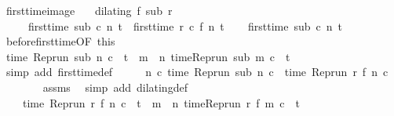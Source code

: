 \begin{isabellebody}
\isamarkupfalse%
\ first{\isacharunderscore}time{\isacharunderscore}image{\isacharcolon}\isanewline
\ \ \ {\isacartoucheopen}dilating\ f\ sub\ r{\isacartoucheclose}\isanewline
\ \ \ \ \ {\isacartoucheopen}first{\isacharunderscore}time\ sub\ c\ n\ t\ {\isacharequal}\ first{\isacharunderscore}time\ r\ c\ {\isacharparenleft}f\ n{\isacharparenright}\ t{\isacartoucheclose}\isanewline
%
\isadelimproof
%
\endisadelimproof
%
\isatagproof
{}\isamarkupfalse%
\isanewline
\ \ \isamarkupfalse%
\ {\isacartoucheopen}first{\isacharunderscore}time\ sub\ c\ n\ t{\isacartoucheclose}\isanewline
\ \ \isamarkupfalse%
\ before{\isacharunderscore}first{\isacharunderscore}time{\isacharbrackleft}OF\ this{\isacharbrackright}\isanewline
\ \ \ \ \isamarkupfalse%
\ {\isacharasterisk}{\isacharcolon}{\isacartoucheopen}time\ {\isacharparenleft}{\isacharparenleft}Rep{\isacharunderscore}run\ sub{\isacharparenright}\ n\ c{\isacharparenright}\ {\isacharequal}\ t\ {\isasymand}\ {\isacharparenleft}{\isasymforall}m\ {\isacharless}\ n{\isachardot}\ time{\isacharparenleft}{\isacharparenleft}Rep{\isacharunderscore}run\ sub{\isacharparenright}\ m\ c{\isacharparenright}\ {\isacharless}\ t{\isacharparenright}{\isacartoucheclose}\isanewline
\ \ \ \ \ \ \isamarkupfalse%
\ {\isacharparenleft}simp\ add{\isacharcolon}\ first{\isacharunderscore}time{\isacharunderscore}def{\isacharparenright}\isanewline
\ \ \isamarkupfalse%
\ \isamarkupfalse%
\ {\isacartoucheopen}{\isasymforall}n\ c{\isachardot}\ time\ {\isacharparenleft}Rep{\isacharunderscore}run\ sub\ n\ c{\isacharparenright}\ {\isacharequal}\ time\ {\isacharparenleft}Rep{\isacharunderscore}run\ r\ {\isacharparenleft}f\ n{\isacharparenright}\ c{\isacharparenright}{\isacartoucheclose}\isanewline
\ \ \ \ \ \ \isamarkupfalse%
\ assms{\isacharparenleft}{}{\isacharparenright}\ \isamarkupfalse%
\ {\isacharparenleft}simp\ add{\isacharcolon}\ dilating{\isacharunderscore}def{\isacharparenright}\isanewline
\ \ \isamarkupfalse%
\ \isamarkupfalse%
\ {\isacharasterisk}{\isacharasterisk}{\isacharcolon}\isanewline
\ \ \ \ {\isacartoucheopen}time\ {\isacharparenleft}{\isacharparenleft}Rep{\isacharunderscore}run\ r{\isacharparenright}\ {\isacharparenleft}f\ n{\isacharparenright}\ c{\isacharparenright}\ {\isacharequal}\ t\ {\isasymand}\ {\isacharparenleft}{\isasymforall}m\ {\isacharless}\ n{\isachardot}\ time{\isacharparenleft}{\isacharparenleft}Rep{\isacharunderscore}run\ r{\isacharparenright}\ {\isacharparenleft}f\ m{\isacharparenright}\ c{\isacharparenright}\ {\isacharless}\ t{\isacharparenright}{\isacartoucheclose}\isanewline

\end{isabellebody}
